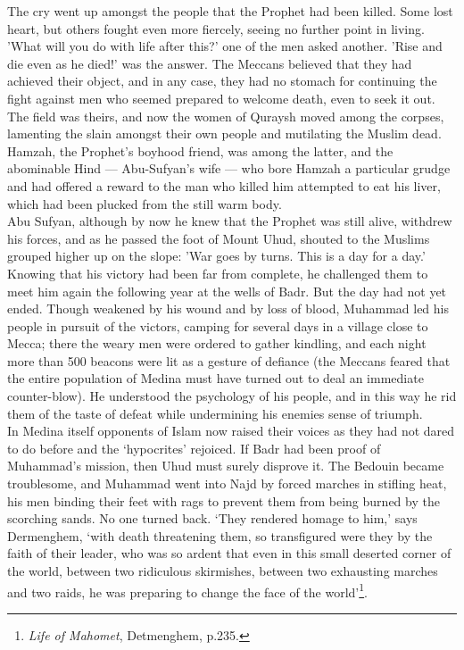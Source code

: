 \documentclass[10pt, twoside]{book}
\begin{document}
The cry went up amongst the people that the Prophet had been killed. Some lost heart, but others 
fought even more fiercely, seeing no further point in living. 'What will you do with life after 
this?' one of the men asked another. 'Rise and die even as he died!' was the answer. The Meccans 
believed that they had achieved their object, and in any case, they had no stomach for continuing the 
fight against men who seemed prepared to welcome death, even to seek it out. The field was theirs, 
and now the women of Quraysh moved among the corpses, lamenting the slain amongst their own people 
and mutilating the Muslim dead. Hamzah, the Prophet's boyhood friend, was among the latter, and the 
abominable Hind --- Abu-Sufyan's wife --- who bore Hamzah a particular grudge and had offered a reward to the man who killed him attempted to eat his liver, which had been plucked from the still warm 
body. \\

Abu Sufyan, although by now he knew that the Prophet was still alive, withdrew his forces, and as he 
passed the foot of Mount Uhud, shouted to the Muslims grouped higher up on the slope: 'War goes by 
turns. This is a day for a day.' Knowing that his victory had been far from complete, he challenged 
them to meet him again the following year at the wells of Badr. But the day had not yet ended. Though 
weakened by his wound and by loss of blood, Muhammad led his people in pursuit of the victors, 
camping for several days in a village close to Mecca; there the weary men were ordered to gather 
kindling, and each night more than 500 beacons were lit as a gesture of defiance (the Meccans feared 
that the entire population of Medina must have turned out to deal an immediate counter\hyp{}blow). He 
understood the psychology of his people, and in this way he rid them of the taste of defeat while 
undermining his enemies sense of triumph. \\

In Medina itself opponents of Islam now raised their voices as they had not dared to do before and 
the `hypocrites' rejoiced. If Badr had been proof of Muhammad's mission, then Uhud must surely 
disprove it. The Bedouin became troublesome, and Muhammad went into Najd by forced marches in 
stifling heat, his men binding their feet with rags to prevent them from being burned by the 
scorching sands. No one turned back. `They rendered homage to him,' says Dermenghem, `with death 
threatening them, so transfigured were they by the faith of their leader, who was so ardent that even 
in this small deserted corner of the world, between two ridiculous skirmishes, between two exhausting 
marches and two raids, he was preparing to change the face of the world'\footnote{\emph{Life of Mahomet}, Detmenghem, p.235.}.\\
\end{document}
